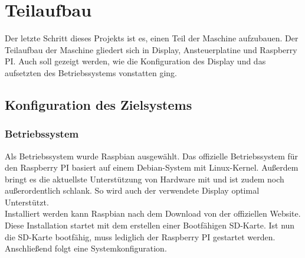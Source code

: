 \section{Teilaufbau}
Der letzte Schritt dieses Projekts ist es, einen Teil der Maschine aufzubauen.
Der Teilaufbau der Maschine gliedert sich in Display, Ansteuerplatine und Raspberry PI.
Auch soll gezeigt werden, wie die Konfiguration des Display und das aufsetzten des Betriebssystems vonstatten ging.
\subsection{Konfiguration des Zielsystems}
\subsubsection{Betriebssystem}
Als Betriebssystem wurde Raspbian ausgewählt.
Das offizielle Betriebssystem für den Raspberry PI basiert auf einem Debian-System mit Linux-Kernel.
Außerdem bringt es die aktuellste Unterstützung von Hardware mit und ist zudem noch außerordentlich schlank.
So wird auch der verwendete Display optimal Unterstützt.\\
Installiert werden kann Raspbian nach dem Download von der offiziellen Website.
Diese Installation startet mit dem erstellen einer Bootfähigen SD-Karte.
Ist nun die SD-Karte bootfähig, muss lediglich der Raspberry PI gestartet werden.
Anschließend folgt eine Systemkonfiguration.
